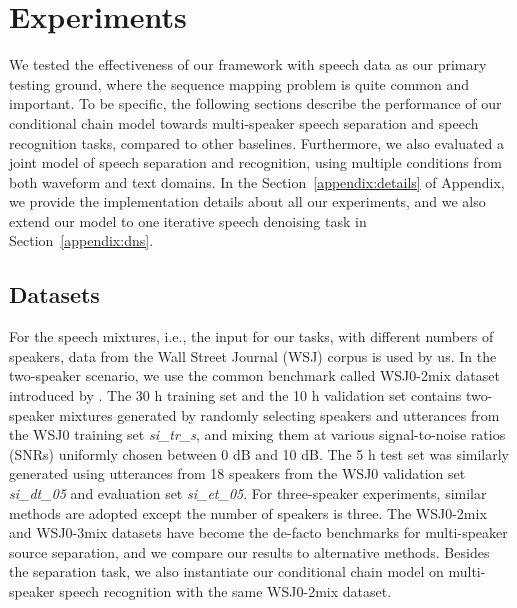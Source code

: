 \documentclass{article}
\begin{document}
\section{Experiments}\label{sec:exp}
We tested the effectiveness of our framework with speech data as our primary testing ground, where the sequence mapping problem is quite common and important. 
To be specific, the following sections describe the performance of our conditional chain model towards multi-speaker speech separation and speech recognition tasks, compared to other baselines. 
Furthermore, we also evaluated a joint model of speech separation and recognition, using multiple conditions from both waveform and text domains. In the Section~\ref{appendix:details} of Appendix, we provide 
the implementation details about all our experiments, and we also extend our model to one iterative speech denoising task in Section~\ref{appendix:dns}. 

\subsection{Datasets}
For the speech mixtures, i.e., the input  for our tasks, with different numbers of speakers, data from the Wall Street Journal (WSJ) corpus is used by us. 
In the two-speaker scenario, we use the common benchmark called WSJ0-2mix dataset introduced by \cite{hershey2016deep}. 
The 30 h training set and the 10 h validation set contains two-speaker mixtures generated by randomly selecting speakers and utterances from the WSJ0 training set \textit{si\_tr\_s}, and mixing them at various signal-to-noise ratios (SNRs) uniformly chosen between 0 dB and 10 dB. The 5 h test set was similarly generated using utterances from 18 speakers from the WSJ0 validation set \textit{si\_dt\_05} and evaluation set \textit{si\_et\_05}. For three-speaker experiments, similar methods are adopted except the number of speakers is three. The WSJ0-2mix and WSJ0-3mix datasets have become the de-facto benchmarks for multi-speaker source separation, and we compare our results to alternative methods. 
Besides the separation task, we also instantiate our conditional chain model on multi-speaker speech recognition with the same WSJ0-2mix dataset.
\end{document}
